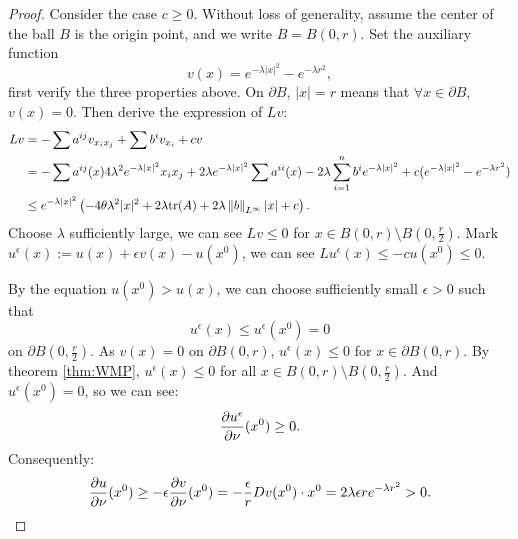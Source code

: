 \begin{proof}
    Consider the case $c\ge 0$. Without loss of generality, assume the center of the ball $B$ is the origin point, and we write $B=B(0,r)$. Set the auxiliary function 
    \begin{equation}
        v(x)=e^{-\lambda |x|^{2}}-e^{-\lambda r^{2}},
    \end{equation}
    first verify the three properties above. On $\partial B$, $|x|=r$ means that $\forall x\in \partial B$, $v(x)=0$. Then derive the expression of $Lv$:
    \begin{equation}
        \label{eq:calc_Lv}
        \begin{aligned}
            Lv&=-\sum a^{ij}v_{x_{i}x_{j}}+\sum b^{i}v_{x_{i}}+cv\\
            &=-\sum a^{ij}(x)4\lambda^2 e^{-\lambda|x|^{2}}x_{i}x_{j}+2\lambda e^{-\lambda |x|^2}\sum a^{ii}(x)-2\lambda\sum_{i=1}^{n}b^{i}e^{-\lambda|x|^2}+c(e^{-\lambda|x|^2}-e^{-\lambda r^{2}})\\
            &\le e^{-\lambda|x|^2}\left(-4\theta \lambda^{2}|x|^{2}+2\lambda\text{tr}(A)+2\lambda\left\|b\right\|_{L^{\infty}}|x|+c\right).
        \end{aligned}
    \end{equation}
    Choose $\lambda$ sufficiently large, we can see $Lv\le 0$ for $x\in B(0,r)\setminus B(0,\frac{r}{2})$. Mark $u^{\epsilon}(x):=u(x)+\epsilon v(x)-u(x^{0})$, we can see $Lu^{\epsilon}(x)\le -cu(x^{0})\le 0$.

    By the equation $u(x^{0})>u(x)$, we can choose sufficiently small $\epsilon>0$ such that 
    \begin{equation}
        u^{\epsilon}(x)\le u^{\epsilon}(x^{0})=0
    \end{equation}
    on $\partial B(0,\frac{r}{2})$. As $v(x)=0$ on $\partial B(0,r)$, $u^{\epsilon}(x)\le 0$ for $x\in \partial B(0,r)$. By theorem \ref{thm:WMP}, $u^{\epsilon}(x)\le 0$ for all $x\in B(0,r)\setminus B(0,\frac{r}{2})$. And $u^{\epsilon}(x^{0})=0$, so we can see:
    \begin{equation}
        \frac{\partial u^{\epsilon}}{\partial \nu}(x^{0})\ge 0.
    \end{equation}
    Consequently:
    \begin{equation}
        \frac{\partial u}{\partial \nu}(x^{0})\ge -\epsilon\frac{\partial v}{\partial \nu}(x^{0})=-\frac{\epsilon}{r}Dv(x^{0})\cdot x^{0}=2\lambda\epsilon r e^{-\lambda r^{2}}>0.
    \end{equation}
\end{proof}
